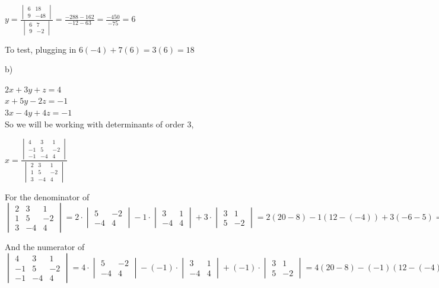 \documentclass[]{report}
\begin{document}
$y = \frac{
	\begin{vmatrix}
	6  & 18\\
	9 & -48
	\end{vmatrix}
}{
	\begin{vmatrix}
	6 & 7 \\
	9 & -2
	\end{vmatrix}
} = \frac{-288 - 162}{-12 - 63} = \frac{-450}{-75} = 6$

To test, plugging in $6(-4) + 7(6) = 3(6) =  18$


b)

$2x + 3y + z = 4$ \\
$x + 5y - 2z = -1$ \\
$3x - 4y + 4z = -1$ \\

So we will be working with determinants of order 3,


$x = \frac{
\begin{vmatrix}
4 & 3 & 1\\
-1 & 5 & -2 \\
-1 & -4 & 4
\end{vmatrix}
}{
\begin{vmatrix}
2 & 3 & 1\\
1 &  5 & -2 \\
3 & -4 & 4
\end{vmatrix}
}$

For the denominator of $
\begin{vmatrix}
2 & 3 & 1\\
1 &  5 & -2 \\
3 & -4 & 4
\end{vmatrix} = 2 \cdot \begin{vmatrix}
5 & -2 \\
-4 & 4
\end{vmatrix} 
- 1 \cdot \begin{vmatrix}
3 & 1 \\
-4 & 4
\end{vmatrix}
+ 3 \cdot \begin{vmatrix}
3 & 1 \\
5 & -2
\end{vmatrix} = 2(20 - 8) - 1(12 - (-4)) + 3(-6 - 5) = 2(12) - 1(16) + 3(-11) = 24 - 16 - 33 = -25
$

And the numerator of $
\begin{vmatrix}
4 & 3 & 1\\
-1 & 5 & -2 \\
-1 & -4 & 4
\end{vmatrix} = 4 \cdot \begin{vmatrix}
5 & -2 \\
-4 & 4
\end{vmatrix}
- (-1)\cdot \begin{vmatrix}
3 & 1 \\
-4 & 4
\end{vmatrix}
+ (-1)\cdot \begin{vmatrix}
3 & 1 \\
5 & -2
\end{vmatrix} = 4(20 - 8) - (-1)(12 - (-4)) + (-1)(-6 - 5) = 4(12) - (-1)(16) + (-1)(-11) = 4(12) + 16 + 11 = 75
$
\end{document}
